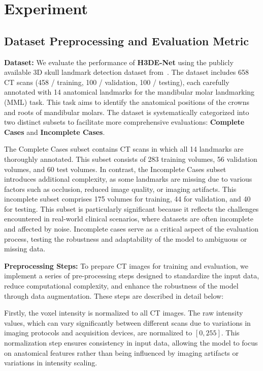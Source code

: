 \section{Experiment}
\subsection{Dataset Preprocessing and Evaluation Metric}\label{sec4}
\noindent \textbf{Dataset:}
We evaluate the performance of \textbf{H3DE-Net} using the publicly available 3D skull landmark detection dataset from~\cite{3D-CNN1-anchor}. The dataset includes 658 CT scans (458 / training, 100 / validation, 100 / testing),  each carefully annotated with 14 anatomical landmarks for the mandibular molar landmarking (MML) task. This task aims to identify the anatomical positions of the crowns and roots of mandibular molars. The dataset is systematically categorized into two distinct subsets to facilitate more comprehensive evaluations: \textbf{Complete Cases} and \textbf{Incomplete Cases}. 

The Complete Cases subset contains CT scans in which all 14 landmarks are thoroughly annotated. This subset consists of 283 training volumes, 56 validation volumes, and 60 test volumes. In contrast, the Incomplete Cases subset introduces additional complexity, as some landmarks are missing due to various factors such as occlusion, reduced image quality, or imaging artifacts. This incomplete subset comprises 175 volumes for training, 44 for validation, and 40 for testing. This subset is particularly significant because it reflects the challenges encountered in real-world clinical scenarios, where datasets are often incomplete and affected by noise. Incomplete cases serve as a critical aspect of the evaluation process, testing the robustness and adaptability of the model to ambiguous or missing data.

\noindent \textbf{Preprocessing Steps:}
To prepare CT images for training and evaluation, we implement a series of pre-processing steps designed to standardize the input data, reduce computational complexity, and enhance the robustness of the model through data augmentation. These steps are described in detail below:

Firstly, the voxel intensity is normalized to all CT images. The raw intensity values, which can vary significantly between different scans due to variations in imaging protocols and acquisition devices, are normalized to $[0, 255]$. This normalization step ensures consistency in input data, allowing the model to focus on anatomical features rather than being influenced by imaging artifacts or variations in intensity scaling.

